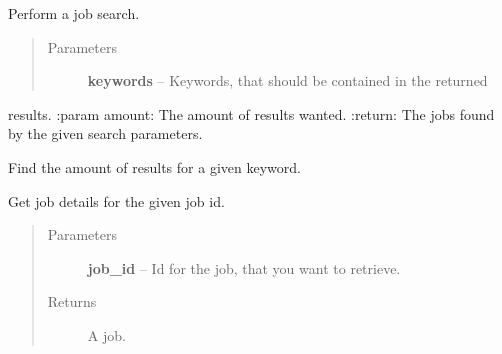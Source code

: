 \documentclass[letterpaper,10pt,english]{sphinxmanual}
\begin{document}
\begin{fulllineitems}
\begin{fulllineitems}
\label{job_searcher:job_searcher.go_jobs.GoJobs.find_results}
Perform a job search.
\begin{quote}\begin{description}
\item[{Parameters}] \leavevmode
\textbf{keywords} -- Keywords, that should be contained in the returned

\end{description}\end{quote}

results.
:param amount: The amount of results wanted.
:return: The jobs found by the given search parameters.

\end{fulllineitems}


\begin{fulllineitems}
\label{job_searcher:job_searcher.go_jobs.GoJobs.find_results_amount}
Find the amount of results for a given keyword.

\end{fulllineitems}


\begin{fulllineitems}
\label{job_searcher:job_searcher.go_jobs.GoJobs.get_details_for_job}
Get job details for the given job id.
\begin{quote}\begin{description}
\item[{Parameters}] \leavevmode
\textbf{job\_id} -- Id for the job, that you want to retrieve.

\item[{Returns}] \leavevmode
A job.

\end{description}\end{quote}

\end{fulllineitems}



\end{fulllineitems}
\end{document}
